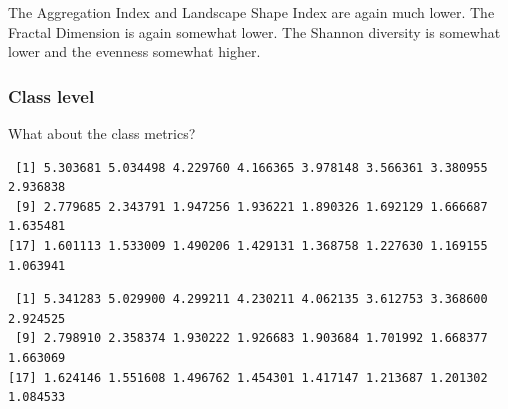 \documentclass[
  letterpaper,
  DIV=11,
  numbers=noendperiod]{scrartcl}
\newenvironment{Shaded}{\begin{snugshade}}{\end{snugshade}}
\newcommand{\AttributeTok}[1]{\textcolor[rgb]{0.40,0.45,0.13}{#1}}
\newcommand{\ConstantTok}[1]{\textcolor[rgb]{0.56,0.35,0.01}{#1}}
\newcommand{\DecValTok}[1]{\textcolor[rgb]{0.68,0.00,0.00}{#1}}
\newcommand{\FloatTok}[1]{\textcolor[rgb]{0.68,0.00,0.00}{#1}}
\newcommand{\FunctionTok}[1]{\textcolor[rgb]{0.28,0.35,0.67}{#1}}
\newcommand{\NormalTok}[1]{\textcolor[rgb]{0.00,0.23,0.31}{#1}}
\newcommand{\OtherTok}[1]{\textcolor[rgb]{0.00,0.23,0.31}{#1}}
\newcommand{\SpecialCharTok}[1]{\textcolor[rgb]{0.37,0.37,0.37}{#1}}
\newcommand{\StringTok}[1]{\textcolor[rgb]{0.13,0.47,0.30}{#1}}
\begin{document}
The Aggregation Index and Landscape Shape Index are again much lower.
The Fractal Dimension is again somewhat lower. The Shannon diversity is
somewhat lower and the evenness somewhat higher.

\hypertarget{class-level-2}{%
\subsubsection{Class level}\label{class-level-2}}

What about the class metrics?

\begin{Shaded}
\end{Shaded}

\begin{verbatim}
 [1] 5.303681 5.034498 4.229760 4.166365 3.978148 3.566361 3.380955 2.936838
 [9] 2.779685 2.343791 1.947256 1.936221 1.890326 1.692129 1.666687 1.635481
[17] 1.601113 1.533009 1.490206 1.429131 1.368758 1.227630 1.169155 1.063941
\end{verbatim}

\begin{Shaded}
\end{Shaded}

\begin{verbatim}
 [1] 5.341283 5.029900 4.299211 4.230211 4.062135 3.612753 3.368600 2.924525
 [9] 2.798910 2.358374 1.930222 1.926683 1.903684 1.701992 1.668377 1.663069
[17] 1.624146 1.551608 1.496762 1.454301 1.417147 1.213687 1.201302 1.084533
\end{verbatim}

\begin{Shaded}
\end{Shaded}
\end{document}
